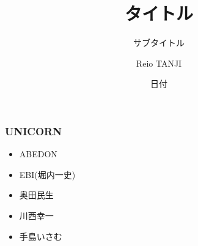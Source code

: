 \documentclass[dvipdfmx,12pt]{beamer}
\title{タイトル}
\subtitle{サブタイトル}
\author{Reio TANJI}
\date{日付}
\institute{Osaka University}
\begin{document}
\begin{frame}\frametitle{}
  \titlepage
\end{frame}

\begin{frame}\frametitle{UNICORN}
  \begin{itemize}
    \item ABEDON

    \item EBI(堀内一史)

    \item 奥田民生

    \item 川西幸一

    \item 手島いさむ
  \end{itemize}
\end{frame}
\end{document}
